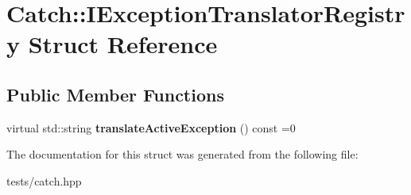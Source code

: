 \hypertarget{struct_catch_1_1_i_exception_translator_registry}{}\section{Catch\+:\+:I\+Exception\+Translator\+Registry Struct Reference}
\label{struct_catch_1_1_i_exception_translator_registry}
\subsection*{Public Member Functions}
\begin{DoxyCompactItemize}
\item 
\mbox{\label{struct_catch_1_1_i_exception_translator_registry_af76ae8c331a17f2a94c9720bc0d686bb}} 
virtual std\+::string {\bfseries translate\+Active\+Exception} () const =0
\end{DoxyCompactItemize}


The documentation for this struct was generated from the following file\+:\begin{DoxyCompactItemize}
\item 
tests/catch.\+hpp\end{DoxyCompactItemize}
